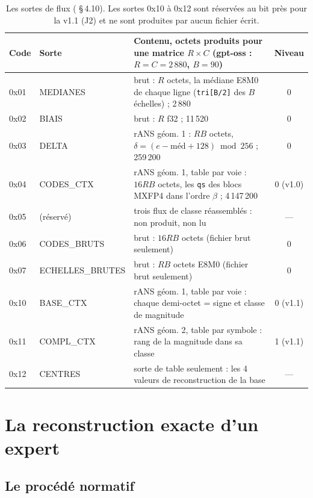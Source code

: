 \begin{table}[ht]
\centering\small
\begin{tabularx}{\linewidth}{l l >{\raggedright\arraybackslash}X c}
\toprule
Code & Sorte & Contenu, octets produits pour une matrice $R \times C$ (gpt-oss : $R = C = 2\,880$, $B = 90$) & Niveau \\
\midrule
0x01 & MEDIANES & brut : $R$ octets, la médiane E8M0 de chaque ligne (\texttt{tri[B/2]} des $B$ échelles) ; 2\,880 & 0 \\
0x02 & BIAIS & brut : $R$ f32 ; 11\,520 & 0 \\
0x03 & DELTA & rANS géom. 1 : $RB$ octets, $\delta = (e - \text{méd} + 128) \bmod 256$ ; 259\,200 & 0 \\
0x04 & CODES\_CTX & rANS géom. 1, table par voie : $16RB$ octets, les \texttt{qs} des blocs MXFP4 dans l'ordre $\beta$ ; 4\,147\,200 & 0 (v1.0) \\
0x05 & (réservé) & trois flux de classe réassemblés : non produit, non lu & — \\
0x06 & CODES\_BRUTS & brut : $16RB$ octets (fichier brut seulement) & 0 \\
0x07 & ECHELLES\_BRUTES & brut : $RB$ octets E8M0 (fichier brut seulement) & 0 \\
0x10 & BASE\_CTX & rANS géom. 1, table par voie : chaque demi-octet = signe et classe de magnitude & 0 (v1.1) \\
0x11 & COMPL\_CTX & rANS géom. 2, table par symbole : rang de la magnitude dans sa classe & 1 (v1.1) \\
0x12 & CENTRES & sorte de table seulement : les 4 valeurs de reconstruction de la base & — \\
\bottomrule
\end{tabularx}
\caption[Les sortes de flux]{Les sortes de flux ( §\,4.10). Les sortes 0x10 à 0x12 sont réservées au bit près pour la v1.1 (J2) et ne sont produites par aucun fichier écrit.}
\label{t2fmt:tab:sortes}
\end{table}

\section{La reconstruction exacte d'un expert}\label{t2fmt:sec:reconstruction}

\subsection{Le procédé normatif}

